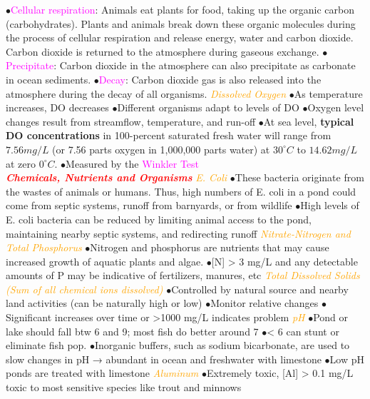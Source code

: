 \documentclass{article}
\newcommand{\ddd}{$\bullet$}
\newcommand{\red}[1]{\textcolor{red}{#1}}
\newcommand{\pink}[1]{\textcolor{magenta}{#1}}
\newcommand{\orange}[1]{\textcolor{orange}{#1}}
\newcommand{\mysection}[1]{\textbf{\textit{\red{#1}}}}
\newcommand{\mysubsection}[1]{{\textit{\orange{#1}}}}
\newcommand{\vocab}[1]{{\pink{#1}}}
\begin{document}
\begin{multicols*}{4}
            \ddd \vocab{Cellular respiration}: Animals eat plants for food, taking up the organic carbon (carbohydrates). Plants and animals break down these organic molecules during the process of cellular respiration and release energy, water and carbon dioxide. Carbon dioxide is returned to the atmosphere during gaseous exchange. 
            \ddd \vocab{Precipitate}: Carbon dioxide in the atmosphere can also precipitate as carbonate in ocean sediments.
            \ddd \vocab{Decay}: Carbon dioxide gas is also released into the atmosphere during the decay of all organisms.
        \mysubsection{Dissolved Oxygen}
            \ddd As temperature increases, DO decreases
            \ddd Different organisms adapt to levels of DO
            \ddd Oxygen level changes result from streamflow, temperature, and run-off
            \ddd At sea level, \textbf{typical DO concentrations} in 100-percent saturated fresh water will range from $7.56 mg/L$ (or 7.56 parts oxygen in 1,000,000 parts water) at $30^\circ C$ to $14.62 mg/L$ at zero $0^\circ C$.
            \ddd Measured by the \vocab{Winkler Test}
            \\
    \mysection{Chemicals, Nutrients and Organisms}
        \mysubsection{E. Coli}
            \ddd These bacteria originate from the wastes of animals or humans. Thus, high numbers of E. coli in a pond could come from septic systems, runoff from barnyards, or from wildlife
            \ddd High levels of E. coli bacteria can be reduced by limiting animal access to the pond, maintaining nearby septic systems, and redirecting runoff
        \mysubsection{Nitrate-Nitrogen and Total Phosphorus}
            \ddd Nitrogen and phosphorus are nutrients that may cause increased growth of aquatic plants and algae.
            \ddd [N] > 3 mg/L and any detectable amounts of P may be indicative of fertilizers, manures, etc
        \mysubsection{Total Dissolved Solids (Sum of all chemical ions dissolved)}
            \ddd Controlled by natural source and nearby land activities (can be naturally high or low)
            \ddd Monitor relative changes
            \ddd Significant increases over time or >1000 mg/L indicates problem
        \mysubsection{pH}
            \ddd Pond or lake should fall btw 6 and 9; most fish do better around 7
            \ddd < 6 can stunt or eliminate fish pop.
            \ddd Inorganic buffers, such as sodium bicarbonate, are used to slow changes in pH → abundant in ocean and freshwater with limestone
            \ddd Low pH ponds are treated with limestone
        \mysubsection{Aluminum}
            \ddd Extremely toxic, [Al] > 0.1 mg/L toxic to most sensitive species like trout and minnows

\end{multicols*}
\end{document}
